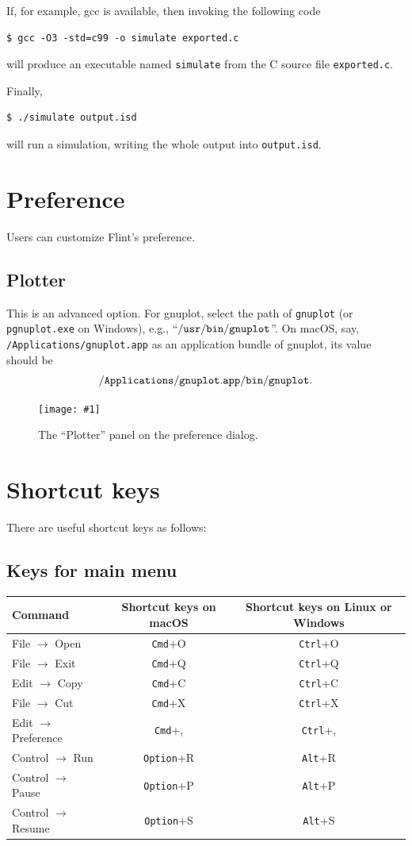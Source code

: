 \documentclass[a4paper,10pt]{report}
\newcommand\FigureOfImage[2]{\begin{figure}[h]
  \centering
  \texttt{[image: \#1]}
  \caption{#2}\label{fig:#1}
\end{figure}}
\begin{document}
If, for example, gcc is available, then invoking the following code
\begin{verbatim}
$ gcc -O3 -std=c99 -o simulate exported.c
\end{verbatim}
will produce an executable named {\tt simulate} from the C source file {\tt exported.c}.

Finally,
\begin{verbatim}
$ ./simulate output.isd
\end{verbatim}
will run a simulation, writing the whole output into {\tt output.isd}.

\section{Preference}
\label{sec:preference}
Users can customize Flint's preference.

\subsection{Plotter}
This is an advanced option.
For gnuplot, select the path of {\tt gnuplot} (or {\tt pgnuplot.exe} on Windows),
e.g., ``$\tt{/usr/bin/gnuplot}$''. On macOS, say,
{\tt /Applications/gnuplot.app} as an application bundle of gnuplot, its value
should be \[{\tt /Applications/gnuplot.app/bin/gnuplot}.\]
\FigureOfImage{preference-plotter}{The ``Plotter'' panel on the preference dialog.}

\section{Shortcut keys}
There are useful shortcut keys as follows:

\subsection{Keys for main menu}
\begin{tabular}{l||c|c}
  Command & Shortcut keys on macOS & Shortcut keys on Linux or Windows\\
  \hline
  File $\rightarrow$ Open & {\tt Cmd}+O & {\tt Ctrl}+O \\
  File $\rightarrow$ Exit & {\tt Cmd}+Q & {\tt Ctrl}+Q \\
  Edit $\rightarrow$ Copy & {\tt Cmd}+C & {\tt Ctrl}+C \\
  File $\rightarrow$ Cut  & {\tt Cmd}+X & {\tt Ctrl}+X \\
  Edit $\rightarrow$ Preference & {\tt Cmd}+, & {\tt Ctrl}+, \\
  Control $\rightarrow$ Run & {\tt Option}+R & {\tt Alt}+R \\
  Control $\rightarrow$ Pause & {\tt Option}+P & {\tt Alt}+P \\
  Control $\rightarrow$ Resume & {\tt Option}+S & {\tt Alt}+S \\
\end{tabular}
\end{document}
